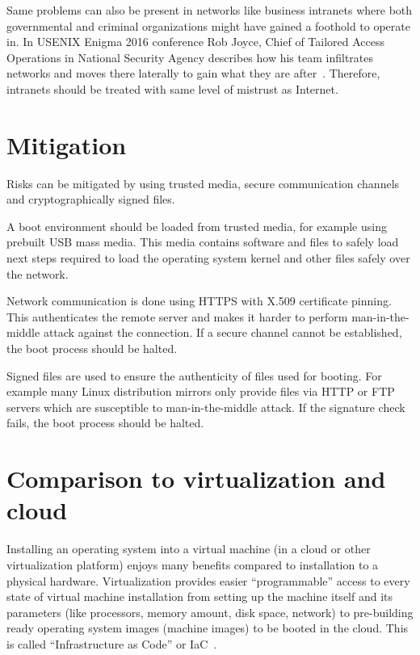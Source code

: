 Same problems can also be present in networks like business intranets
where both governmental and criminal organizations might have gained a
foothold to operate in. In USENIX Enigma 2016 conference Rob Joyce,
Chief of Tailored Access Operations in National Security Agency
describes how his team infiltrates networks and moves there laterally
to gain what they are after~\cite{nsa-tao}. Therefore, intranets
should be treated with same level of mistrust as Internet.


\section{Mitigation}

Risks can be mitigated by using trusted media, secure communication
channels and cryptographically signed files.

A boot environment should be loaded from trusted media, for example
using prebuilt USB mass media. This media contains software and files
to safely load next steps required to load the operating system kernel
and other files safely over the network.

Network communication is done using HTTPS with X.509 certificate
pinning. This authenticates the remote server and makes it harder to
perform man-in-the-middle attack against the connection. If a secure
channel cannot be established, the boot process should be halted.

Signed files are used to ensure the authenticity of files used for
booting. For example many Linux distribution mirrors only provide
files via HTTP or FTP servers which are susceptible to
man-in-the-middle attack. If the signature check fails, the boot
process should be halted.


\section{Comparison to virtualization and cloud}

Installing an operating system into a virtual machine (in a cloud or
other virtualization platform) enjoys many benefits compared to
installation to a physical hardware. Virtualization provides easier
``programmable'' access to every state of virtual machine installation
from setting up the machine itself and its parameters (like
processors, memory amount, disk space, network) to pre-building ready
operating system images (machine images) to be booted in the
cloud. This is called ``Infrastructure as Code'' or
IaC~\cite{spinellis}.


